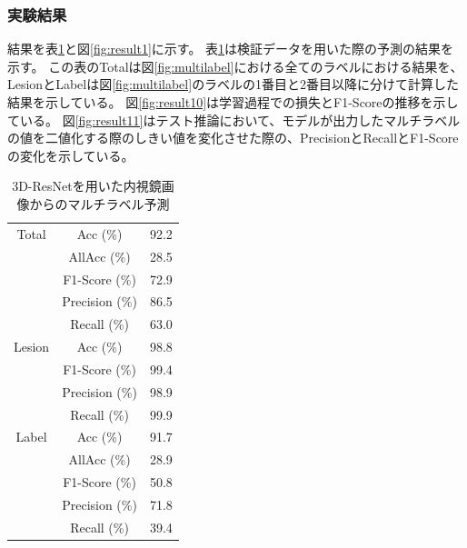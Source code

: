 \subsubsection{実験結果}
結果を表\ref{tb:1}と図\ref{fig:result1}に示す。
表\ref{tb:1}は検証データを用いた際の予測の結果を示す。
この表のTotalは図\ref{fig:multilabel}における全てのラベルにおける結果を、LesionとLabelは図\ref{fig:multilabel}のラベルの1番目と2番目以降に分けて計算した結果を示している。
図\ref{fig:result10}は学習過程での損失とF1-Scoreの推移を示している。
図\ref{fig:result11}はテスト推論において、モデルが出力したマルチラベルの値を二値化する際のしきい値を変化させた際の、PrecisionとRecallとF1-Scoreの変化を示している。

\begin{table}[tb]
    \caption[]{3D-ResNetを用いた内視鏡画像からのマルチラベル予測}
    \label{tb:1}
    \centering
    \normalsize
    \begin{tabular}{c|c|r} \hline
        Total & Acc (\%) & 92.2 \\ \cline{2-3}
         & AllAcc (\%) & 28.5 \\ \cline{2-3}
         & F1-Score (\%) & 72.9 \\ \cline{2-3}
         & Precision (\%) & 86.5 \\ \cline{2-3}
         & Recall (\%) & 63.0 \\ \hline
        Lesion & Acc (\%) & 98.8 \\ \cline{2-3}
         & F1-Score (\%) & 99.4 \\ \cline{2-3}
         & Precision (\%) & 98.9 \\ \cline{2-3}
         & Recall (\%) & 99.9 \\ \hline
        Label & Acc (\%) & 91.7 \\ \cline{2-3}
         & AllAcc (\%) & 28.9 \\ \cline{2-3}
         & F1-Score (\%) & 50.8 \\ \cline{2-3}
         & Precision (\%) & 71.8 \\ \cline{2-3}
         & Recall (\%) & 39.4 \\ \hline
    \end{tabular}
\end{table}
